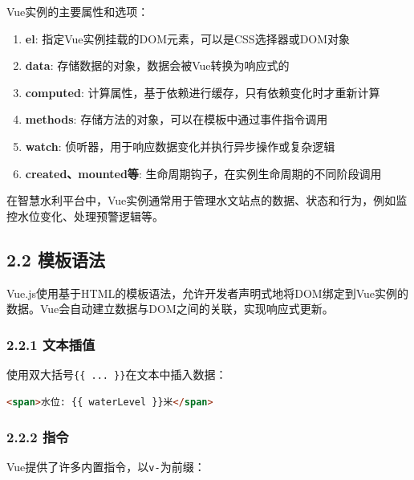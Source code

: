 Vue实例的主要属性和选项：

\begin{enumerate}
\def\labelenumi{\arabic{enumi}.}
\tightlist
\item
  \textbf{el}: 指定Vue实例挂载的DOM元素，可以是CSS选择器或DOM对象
\item
  \textbf{data}: 存储数据的对象，数据会被Vue转换为响应式的
\item
  \textbf{computed}:
  计算属性，基于依赖进行缓存，只有依赖变化时才重新计算
\item
  \textbf{methods}: 存储方法的对象，可以在模板中通过事件指令调用
\item
  \textbf{watch}: 侦听器，用于响应数据变化并执行异步操作或复杂逻辑
\item
  \textbf{created、mounted等}:
  生命周期钩子，在实例生命周期的不同阶段调用
\end{enumerate}

在智慧水利平台中，Vue实例通常用于管理水文站点的数据、状态和行为，例如监控水位变化、处理预警逻辑等。

\subsection{2.2 模板语法}\label{ux6a21ux677fux8bedux6cd5}

Vue.js使用基于HTML的模板语法，允许开发者声明式地将DOM绑定到Vue实例的数据。Vue会自动建立数据与DOM之间的关联，实现响应式更新。

\subsubsection{2.2.1 文本插值}\label{ux6587ux672cux63d2ux503c}

使用双大括号\passthrough{\lstinline!\{\{ ... \}\}!}在文本中插入数据：

\begin{lstlisting}[language=HTML]
<span>水位: {{ waterLevel }}米</span>
\end{lstlisting}

\subsubsection{2.2.2 指令}\label{ux6307ux4ee4}

Vue提供了许多内置指令，以\passthrough{\lstinline!v-!}为前缀：

